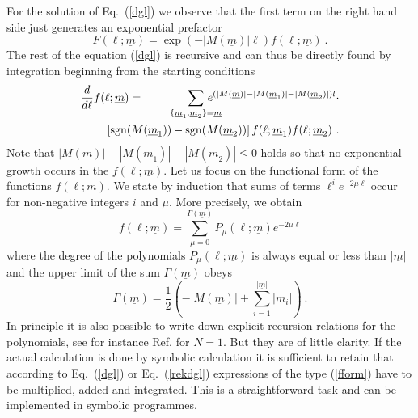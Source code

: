For the solution of Eq.~(\ref{dgl}) we observe that the first term
on the right hand side just generates an exponential prefactor
\begin{equation}
\label{fansatz}
F(\ell;\underline{m}) = \exp(-|M(\underline{m})|\ell)
f(\ell;\underline{m})\ .
\end{equation}
The rest of the equation (\ref{dgl}) is recursive and can thus be 
directly found by integration beginning from the starting conditions
\begin{eqnarray}\nonumber
\frac{d}{d\ell}f(\ell;\underline{m}) &=& 
 \hspace{-3mm}
\sum_{\{ \underline{m}_1,\underline{m}_2\}
=\underline{m}} \hspace{-5mm} 
e^{(|M(\underline{m})|-|M(\underline{m}_1)|-|M(\underline{m}_2)|)l}\cdot\\
&& \hspace{-14mm} \left[{\rm sgn}(M(\underline{m}_1)) -
{\rm sgn}(M(\underline{m}_2))  \right]
f(\ell;\underline{m}_1)f(\ell;\underline{m}_2) \ .
\label{rekdgl}
\end{eqnarray}
Note that $|M(\underline{m})|-|M(\underline{m}_1)|-|M(\underline{m}_2)|\leq0$
holds so that no exponential growth occurs in the 
$f(\ell;\underline{m})$.
Let us focus on the functional form of the functions 
$f(\ell;\underline{m})$. We state  by induction
that sums of terms $\ell^ie^{-2\mu\ell}$ occur for non-negative
integers $i$ and $\mu$. More precisely, we obtain
\begin{equation}
\label{fform}
f(\ell;\underline{m}) = \sum^{\Gamma(\underline{m})}_{\mu=0}
P_\mu(\ell;\underline{m}) e^{-2\mu\ell}
\end{equation}
where the degree of the polynomials $P_\mu(\ell;\underline{m})$
is always equal or less than $|\underline{m}|$ and the upper limit of the
sum $\Gamma(\underline{m})$ obeys
\begin{equation}
\Gamma(\underline{m})= \frac{1}{2} \left(-|M(\underline{m})|+
\sum_{i=1}^{|\underline{m}|} |m_i| \right)\ .
\end{equation}
In principle it is also possible to write down explicit recursion
relations for the polynomials, see for instance Ref. \cite{stein97} for $N=1$.
But they are of little clarity.
If the actual calculation is done by symbolic calculation it is
sufficient to retain that according to Eq.~(\ref{dgl}) or 
Eq.~(\ref{rekdgl}) expressions of the type
(\ref{fform}) have to be multiplied, added and integrated.
This is a straightforward task and
can be implemented in symbolic programmes.

